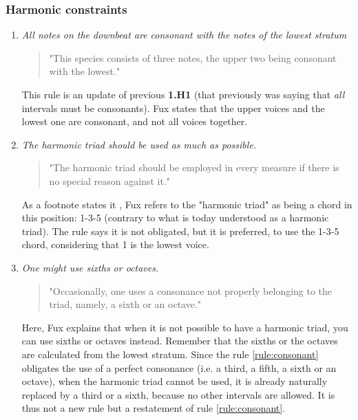 \subsubsection{Harmonic constraints}
\begin{enumerate}[wide, label=\bfseries 1.H\arabic*]
    \item\label{rule:consonant} \textit{All notes on the downbeat are consonant with the notes of the lowest stratum}
     
    \begin{quotation}
       "This species consists of three notes, the upper two being consonant with the lowest."
       \textcite[p.71]{GaPEng}
   \end{quotation}

   This rule is an update of previous \textbf{1.H1} (that previously was saying that \textit{all} intervals must be consonants). Fux states that the upper voices and the lowest one are consonant, and not all voices together. 
    
    \setcounter{enumi}{7} %

    \item\label{rule:harmonic-triad} \reddot \textit{The harmonic triad should be used as much as possible.}

    \begin{quotation}
    "The harmonic triad should be employed in every measure if there is no special reason against it."
    \textcite[p.71]{GaPEng}
    \end{quotation}

    As a footnote states it \cite[footnote, p.71]{GaPEng}, Fux refers to the "harmonic triad" as being a chord in this position: 1-3-5 (contrary to what is today understood as a harmonic triad).
    The rule says it is not obligated, but it is preferred, to use the 1-3-5 chord, considering that 1 is the lowest voice.
    

    \item\label{rule:sixth-or-octaves} \reddot \textit{One might use sixths or octaves.}

    \begin{quotation}
    "Occasionally, one uses a consonance not properly belonging to the triad, namely, a sixth or an octave."
    \textcite[p.72]{GaPEng}
    \end{quotation}

    Here, Fux explains that when it is not possible to have a harmonic triad, you can use sixths or octaves instead. Remember that the sixths or the octaves are calculated from the lowest stratum. Since the rule \ref{rule:consonant} obligates the use of a perfect consonance (i.e. a third, a fifth, a sixth or an octave), when the harmonic triad cannot be used, it is already naturally replaced by a third or a sixth, because no other intervals are allowed. It is thus not a new rule but a restatement of rule \ref{rule:consonant}.    


\end{enumerate}
